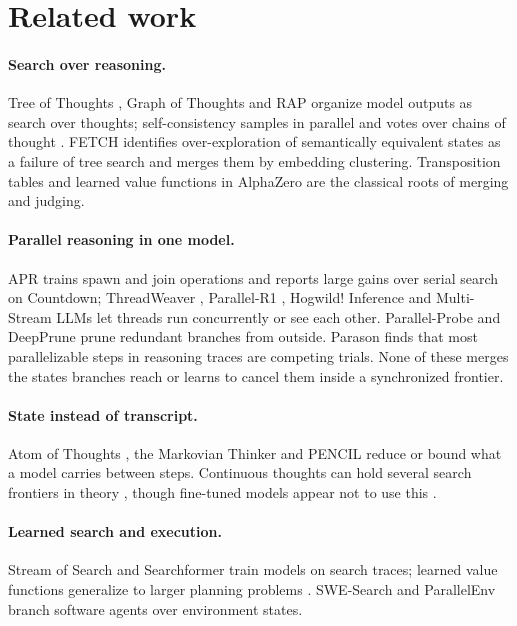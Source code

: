 \documentclass[10pt,twocolumn]{article}
\begin{document}
\section{Related work}

\paragraph{Search over reasoning.} Tree of Thoughts \citep{yao2023tot}, Graph of Thoughts \citep{besta2024got} and RAP \citep{hao2023rap} organize model outputs as search over thoughts; self-consistency \citep{wang2022selfconsistency} samples in parallel and votes over chains of thought \citep{wei2022cot}. FETCH \citep{wang2025fetch} identifies over-exploration of semantically equivalent states as a failure of tree search and merges them by embedding clustering. Transposition tables \citep{zobrist1970} and learned value functions in AlphaZero \citep{silver2018alphazero} are the classical roots of merging and judging.

\paragraph{Parallel reasoning in one model.} APR \citep{pan2025apr} trains spawn and join operations and reports large gains over serial search on Countdown; ThreadWeaver \citep{lian2025threadweaver}, Parallel-R1 \citep{zheng2025parallelr1}, Hogwild! Inference \citep{rodionov2025hogwild} and Multi-Stream LLMs \citep{su2026multistream} let threads run concurrently or see each other. Parallel-Probe \citep{zheng2026probe} and DeepPrune \citep{tu2025deepprune} prune redundant branches from outside. Parason \citep{zhang2026parason} finds that most parallelizable steps in reasoning traces are competing trials. None of these merges the states branches reach or learns to cancel them inside a synchronized frontier.

\paragraph{State instead of transcript.} Atom of Thoughts \citep{teng2025aot}, the Markovian Thinker \citep{aghajohari2025markovian} and PENCIL \citep{yang2025pencil} reduce or bound what a model carries between steps. Continuous thoughts can hold several search frontiers in theory \citep{zhu2025superposition}, though fine-tuned models appear not to use this \citep{rizvi2026illusion}.

\paragraph{Learned search and execution.} Stream of Search \citep{gandhi2024sos} and Searchformer \citep{lehnert2024searchformer} train models on search traces; learned value functions generalize to larger planning problems \citep{aichmuller2026search}. SWE-Search \citep{antoniades2024swesearch} and ParallelEnv \citep{tan2026parallelenv} branch software agents over environment states.
\end{document}
